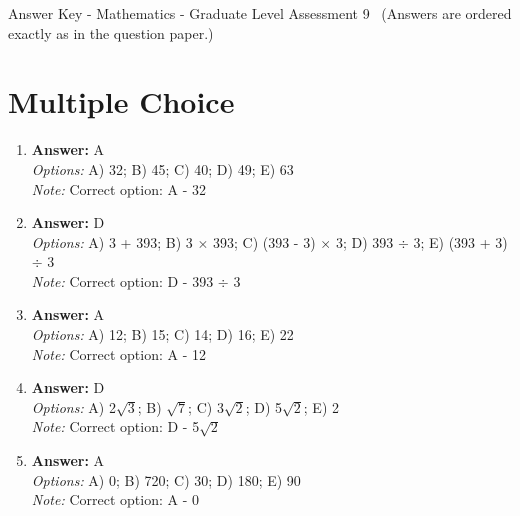 \documentclass[12pt]{article}
\begin{document}
\begin{center}
Answer Key - Mathematics - Graduate Level Assessment 9 \
\small (Answers are ordered exactly as in the question paper.)
\end{center}

\section*{Multiple Choice}
\begin{enumerate}[label=\arabic*.]
\item \textbf{Answer:} A
\\ \textit{Options:} A) 32; B) 45; C) 40; D) 49; E) 63
\\ \textit{Note:} Correct option: A - 32
\item \textbf{Answer:} D
\\ \textit{Options:} A) 3 + 393; B) 3 \ensuremath{\times} 393; C) (393 - 3) \ensuremath{\times} 3; D) 393 \ensuremath{\div} 3; E) (393 + 3) \ensuremath{\div} 3
\\ \textit{Note:} Correct option: D - 393 \ensuremath{\div} 3
\item \textbf{Answer:} A
\\ \textit{Options:} A) 12; B) 15; C) 14; D) 16; E) 22
\\ \textit{Note:} Correct option: A - 12
\item \textbf{Answer:} D
\\ \textit{Options:} A) 2\ensuremath{\sqrt{3}}; B) \ensuremath{\sqrt{7}}; C) 3\ensuremath{\sqrt{2}}; D) 5\ensuremath{\sqrt{2}}; E) 2
\\ \textit{Note:} Correct option: D - 5\ensuremath{\sqrt{2}}
\item \textbf{Answer:} A
\\ \textit{Options:} A) 0; B) 720; C) 30; D) 180; E) 90
\\ \textit{Note:} Correct option: A - 0
\end{enumerate}
\end{document}
